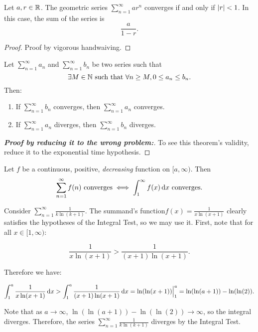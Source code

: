 \documentclass{article}
\begin{document}
    \begin{prop}
      Let \(a, r \in \mathbb{R}\). The geometric series \(\displaystyle\sum_{n=1}^{\infty}ar^n\) converges if and only if \(\left\lvert r\right\rvert < 1\). In this case, the sum of the series is 
      \[
        \frac{a}{1-r}.
      \]
    \end{prop}

    \begin{proof}
      Proof by vigorous handwaiving.
    \end{proof}


    \begin{prop}
      \everymath{\displaystyle}
      \normalfont Let \(\sum_{n=1}^{\infty}a_n\) and \(\sum_{n=1}^{\infty}b_n\) be two series such that 
      \[
        \exists M \in \mathbb{N} \text{ such that } \forall n \geq M, 0 \leq a_n \leq b_n.
      \]
      \noindent
      Then:
      \begin{enumerate}
        \item If \(\sum_{n=1}^{\infty}b_n\) converges, then \(\sum_{n=1}^{\infty}a_n\) converges.
        \item If \(\sum_{n=1}^{\infty}a_n\) diverges, then \(\sum_{n=1}^{\infty}b_n\) diverges.
        \end{enumerate}
    \end{prop}

    \begin{proof}[\textbf{Proof by reducing it to the wrong problem:}] To see this theorem's validity, reduce it to the exponential time hypothesis.
    \end{proof}

    \begin{prop}
      \everymath{\displaystyle}
      Let \(f\) be a continuous, positive, \emph{decreasing} function on \([a,\infty)\). Then 
      \[
      \sum_{n=1}^{\infty}f(n) \text{ converges} \iff \int_{1}^{\infty}f(x) \, \mathrm{d} x \text{ converges}.
      \]
      \end{prop}

      {
       \everymath{\displaystyle} 
       \begin{eg}
        Consider \(\sum_{n=1}^{\infty}\frac{1}{k\ln(k+1)}\). The summand's function\(f(x) = \frac{1}{x\ln(x+1)}\) clearly satisfies the hypotheses of the Integral  Test, so we may use it. First, note that for all \(x \in [1, \infty)\):

        \[
          \frac{1}{x\ln(x+1)} > \frac{1}{(x+1)\ln(x+1)}.
        \]
       \end{eg}

       Therefore we have:

        \[
          \int_{1}^{a}\frac{1}{x\ln(x+1)} \, \mathrm{d} x > \int_{1}^{a}\frac{1}{(x+1)\ln(x+1)} \, \mathrm{d} x = \ln(\ln(x+1))\Big|_{1}^{a} = \ln(\ln(a+1)) - \ln(\ln(2)).
        \]

        Note that as \(a \to \infty\), \(\ln(\ln(a+1)) - \ln(\ln(2)) \to \infty\), so the integral diverges. Therefore, the series \(\sum_{n=1}^{\infty}\frac{1}{k\ln(k+1)}\) diverges by the Integral Test.

      }
\end{document}
